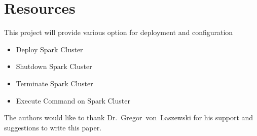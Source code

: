 \section{Resources}
This project will provide various option for deployment and configuration
\begin{itemize}
	\item Deploy Spark Cluster
	\item Shutdown Spark Cluster
	\item Terminate Spark Cluster
	\item Execute Command on Spark Cluster
\end{itemize}

\begin{acks}

  The authors would like to thank Dr.~Gregor~von~Laszewski for his
  support and suggestions to write this paper.

\end{acks}


 

